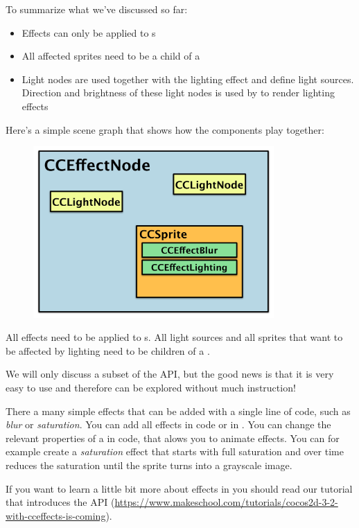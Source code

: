 To summarize what we've discussed so far: 
\begin{itemize}
  \item Effects can only be applied to
\ccsprite{}s
\item All affected sprites need to be a child of a
\item Light nodes are used together with the lighting
effect and define light sources. Direction and brightness of these light nodes
is used by \cocos{} to render lighting effects
\end{itemize}

Here's a simple scene graph that shows how the components play together:

\begin{figure}[H]
    \centering
    \includegraphics[width=260pt]{images/Chapter9/effect_setup.png}
\end{figure}

All effects need to be applied to \ccsprite{}s. All light sources and all
sprites that want to be affected by lighting need to be children of a
.

We will only discuss a subset of the  API, but the good
news is that it is very easy to use and therefore can be explored without much
instruction! 

There a many simple effects that can be added with a single line of
code, such as \textit{blur} or \textit{saturation}. You can add all effects in
code or in \SB{}. You can change the relevant
properties of a  in code, that
alows you to animate effects. You can for example create
a \textit{saturation} effect that starts with full
saturation and over time reduces the saturation until
the sprite turns into a grayscale image.

\begin{details}
If you want to learn a little bit more about effects in \cocos{} you should read
our tutorial that introduces the  
API (\url{https://www.makeschool.com/tutorials/cocos2d-3-2-with-cceffects-is-coming}).
\end{details}

